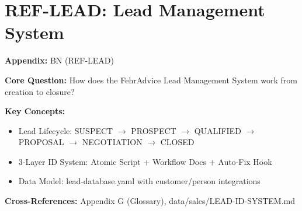 \chapter{REF-LEAD: Lead Management System}
\label{app:lead-system}


\begin{tcolorbox}[colback=blue!5!white, colframe=blue!75!black,
    title=Quick Reference: Appendix UNMAPPED_BN]

\textbf{Appendix:} BN (REF-LEAD)

\textbf{Core Question:} How does the FehrAdvice Lead Management System work from creation to closure?

\textbf{Key Concepts:}
\begin{itemize}[nosep]
\item Lead Lifecycle: SUSPECT $\to$ PROSPECT $\to$ QUALIFIED $\to$ PROPOSAL $\to$ NEGOTIATION $\to$ CLOSED
\item 3-Layer ID System: Atomic Script + Workflow Docs + Auto-Fix Hook
\item Data Model: lead-database.yaml with customer/person integrations
\end{itemize}

\textbf{Cross-References:} Appendix G (Glossary), data/sales/LEAD-ID-SYSTEM.md
\end{tcolorbox}


\begin{abstract}
This appendix documents the complete FehrAdvice Lead Management System, providing operational guidance for the sales pipeline from lead identification through closure. It covers the 6-stage lifecycle model, the 3-layer ID prevention architecture that ensures data integrity, the YAML-based data model with cross-references to customer and person profiles, and the automated workflows including /lead-add and /meeting slash commands. The system integrates with Claude Code for automation while maintaining human oversight for strategic decisions.
\end{abstract}


